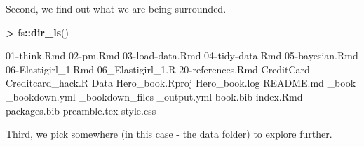 \documentclass[]{book}
\newenvironment{Shaded}{\begin{snugshade}}{\end{snugshade}}
\newcommand{\DecValTok}[1]{\textcolor[rgb]{0.00,0.00,0.81}{#1}}
\newcommand{\FloatTok}[1]{\textcolor[rgb]{0.00,0.00,0.81}{#1}}
\newcommand{\KeywordTok}[1]{\textcolor[rgb]{0.13,0.29,0.53}{\textbf{#1}}}
\newcommand{\NormalTok}[1]{#1}
\newcommand{\OperatorTok}[1]{\textcolor[rgb]{0.81,0.36,0.00}{\textbf{#1}}}
\newcommand{\StringTok}[1]{\textcolor[rgb]{0.31,0.60,0.02}{#1}}
\begin{document}
Second, we find out what we are being surrounded.

\begin{Shaded}
\begin{Highlighting}[]
\OperatorTok{>}\StringTok{ }\NormalTok{fs}\OperatorTok{::}\KeywordTok{dir_ls}\NormalTok{()}

\DecValTok{01}\OperatorTok{-}\NormalTok{think.Rmd           }\DecValTok{02}\OperatorTok{-}\NormalTok{pm.Rmd              }\DecValTok{03}\OperatorTok{-}\NormalTok{load}\OperatorTok{-}\NormalTok{data.Rmd       }\DecValTok{04}\OperatorTok{-}\NormalTok{tidy}\OperatorTok{-}\NormalTok{data.Rmd       }
\DecValTok{05}\OperatorTok{-}\NormalTok{bayesian.Rmd        }\DecValTok{06}\OperatorTok{-}\NormalTok{Elastigirl_}\FloatTok{1.}\NormalTok{Rmd }\DecValTok{06}\NormalTok{_Elastigirl_}\FloatTok{1.}\NormalTok{R   }\DecValTok{20}\OperatorTok{-}\NormalTok{references.Rmd      }
\NormalTok{CreditCard             Creditcard_hack.R      Data                   Hero_book.Rproj        }
\NormalTok{Hero_book.log          README.md              _book                  _bookdown.yml          }
\NormalTok{_bookdown_files        _output.yml            book.bib               index.Rmd              }
\NormalTok{packages.bib           preamble.tex           style.css }
\end{Highlighting}
\end{Shaded}

Third, we pick somewhere (in this case - the data folder) to explore further.
\end{document}
